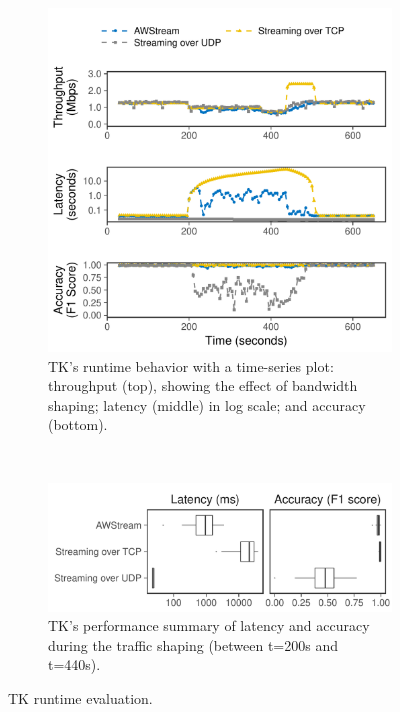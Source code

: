 \documentclass[twocolumn]{article}
\begin{document}
\begin{figure}[t]
  \begin{subfigure}[t]{\columnwidth}
    \centering
    \includegraphics[width=\columnwidth]{figures/runtime_tk-timeseries.pdf}
    \caption{TK's runtime behavior with a time-series plot: throughput (top),
      showing the effect of bandwidth shaping; latency (middle) in log scale;
      and accuracy (bottom).}
    \label{fig:tk-runtime-timeseries}
  \end{subfigure}
  \vspace{1em}
  \\
  \begin{subfigure}[t]{\columnwidth}
    \centering
    \includegraphics[width=\columnwidth]{figures/runtime_tk-boxplot.pdf}
    \caption{TK's performance summary of latency and accuracy during the traffic
      shaping (between t=200s and t=440s).}
    \label{fig:tk-runtime-boxplot}
  \end{subfigure}
  \caption{TK runtime evaluation.}
  \label{fig:tk-runtime}
\end{figure}
\end{document}
